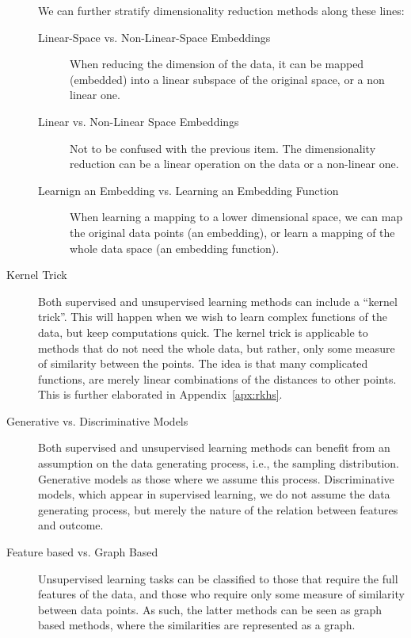 \begin{description}
We can further stratify dimensionality reduction methods along these lines:
	\begin{description}
	\item[Linear-Space vs. Non-Linear-Space Embeddings] 
	When reducing the dimension of the data, it can be mapped (embedded) into a linear subspace of the original space, or a non linear one.
	\item[Linear vs. Non-Linear Space Embeddings]
	Not to be confused with the previous item. 
	The dimensionality reduction can be a linear operation on the data or a non-linear one.
	\item[Learnign an Embedding vs. Learning an Embedding Function]
	When learning a mapping to a lower dimensional space, we can map the original data points (an embedding), or learn a mapping of the whole data space (an embedding function).
	\end{description}

\item[Kernel Trick]
Both supervised and unsupervised learning methods can include a ``kernel trick''. 
This will happen when we wish to learn complex functions of the data, but keep computations quick.
The kernel trick is applicable to methods that do not need the whole data, but rather, only some measure of similarity between the points. 
The idea is that many complicated functions, are merely linear combinations of the distances to other points.
This is further elaborated in Appendix~\ref{apx:rkhs}.

\item[Generative vs. Discriminative Models]
Both supervised and unsupervised learning methods can benefit from an assumption on the data generating process, i.e., the sampling distribution.
Generative models as those where we assume this process. 
Discriminative models, which appear in supervised learning, we do not assume the data generating process, but merely the nature of the relation between features and outcome.

\item[Feature based vs. Graph Based]
Unsupervised learning tasks can be classified to those that require the full features of the data, and those who require only some measure of similarity between data points. As such, the latter methods can be seen as graph based methods, where the similarities are represented as a graph.

\end{description}



